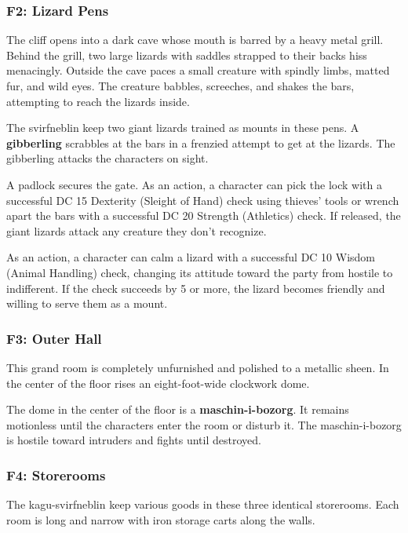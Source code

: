\documentclass[10pt,a4paper,twoside,bg=print,twocolumn,openany,nodeprecatedcode]{dndbook}
\begin{document}
\subsubsection{F2: Lizard Pens}
\begin{DndReadAloud}{}
The cliff opens into a dark cave whose mouth is barred by a heavy metal grill. Behind the grill, two large lizards with saddles strapped to their backs hiss menacingly. Outside the cave paces a small creature with spindly limbs, matted fur, and wild eyes. The creature babbles, screeches, and shakes the bars, attempting to reach the lizards inside.

\end{DndReadAloud}

The svirfneblin keep two giant lizards trained as mounts in these pens. A \textbf{gibberling} scrabbles at the bars in a frenzied attempt to get at the lizards. The gibberling attacks the characters on sight.

A padlock secures the gate. As an action, a character can pick the lock with a successful DC 15 Dexterity (Sleight of Hand) check using thieves' tools or wrench apart the bars with a successful DC 20 Strength (Athletics) check. If released, the giant lizards attack any creature they don't recognize.

As an action, a character can calm a lizard with a successful DC 10 Wisdom (Animal Handling) check, changing its attitude toward the party from hostile to indifferent. If the check succeeds by 5 or more, the lizard becomes friendly and willing to serve them as a mount.

\subsubsection{F3: Outer Hall}
\begin{DndReadAloud}{}
This grand room is completely unfurnished and polished to a metallic sheen. In the center of the floor rises an eight-foot-wide clockwork dome.

\end{DndReadAloud}

The dome in the center of the floor is a \textbf{maschin-i-bozorg}. It remains motionless until the characters enter the room or disturb it. The maschin-i-bozorg is hostile toward intruders and fights until destroyed.

\subsubsection{F4: Storerooms}
The kagu-svirfneblin keep various goods in these three identical storerooms. Each room is long and narrow with iron storage carts along the walls.
\end{document}
